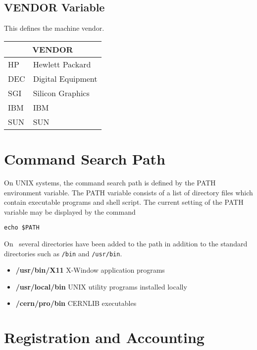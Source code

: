 \subsection {VENDOR Variable}
 
This defines the machine vendor.
 
\begin{center}
\begin{tabular}{ll}
\multicolumn{2}{c}{VENDOR} \\
\hline
HP           & Hewlett Packard                               \\
DEC          & Digital Equipment                             \\
SGI          & Silicon Graphics                              \\
IBM          & IBM                                           \\
SUN          & SUN                                           \\
\end{tabular}
\end{center}
 
 
 
 
\section{Command Search Path}
 
On UNIX systems, the command search path is defined by the PATH
environment variable.
The PATH variable consists of a list of directory files which
contain executable programs and shell script.
The current setting of the PATH variable may be displayed by the
command
\begin{center}
{\tt echo \$PATH}
\end{center}
 
On \shift\, several directories have been
added to the path in addition to the standard directories such as
{\tt /bin} and {\tt /usr/bin}.
 
\begin{itemize}
\item {\bf /usr/bin/X11} X-Window application programs
\item {\bf /usr/local/bin} UNIX utility programs installed locally
\item {\bf /cern/pro/bin} CERNLIB executables
\end{itemize}
 
\section{Registration and Accounting}
 
